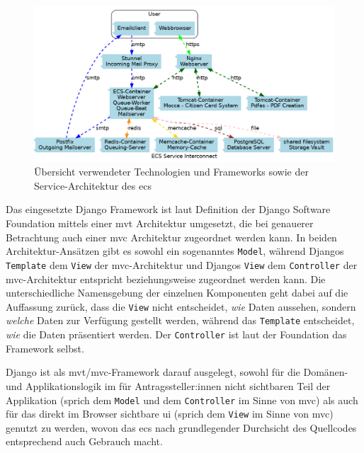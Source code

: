 \documentclass[a4paper,12pt,twoside]{scrreprt}
\begin{document}
\begin{figure}[ht]
    \centering
    \includegraphics[width=\linewidth]{thesis/images/ECS_Service-Architecture.png}
    \caption[Übersicht verwendeter Technologien und Frameworks sowie der Service-Architektur des \acl{ecs}]{Übersicht verwendeter Technologien und Frameworks sowie der Service-Architektur des \acl{ecs} \cite{medizinische_universitat_wien_ecs_2021}}
    \label{fig:ecs-service-architektur}
\end{figure}

Das eingesetzte Django Framework ist laut Definition der Django Software Foundation mittels einer \ac{mvt} Architektur umgesetzt, die bei genauerer Betrachtung auch einer \ac{mvc} Architektur zugeordnet werden kann. In beiden Architektur-Ansätzen gibt es sowohl ein sogenanntes \texttt{Model}, während Djangos \texttt{Template} dem \texttt{View} der \ac{mvc}-Architektur und Djangos \texttt{View} dem \texttt{Controller} der \ac{mvc}-Architektur entspricht beziehungsweise zugeordnet werden kann. Die unterschiedliche Namensgebung der einzelnen Komponenten geht dabei auf die Auffassung zurück, dass die \texttt{View} nicht entscheidet, \textit{wie} Daten aussehen, sondern \textit{welche} Daten zur Verfügung gestellt werden, während das \texttt{Template} entscheidet, \textit{wie} die Daten präsentiert werden. Der \texttt{Controller} ist laut der Foundation das Framework selbst. \cite{django_software_foundation_faq_2023}

\medskip

Django ist als \ac{mvt}/\ac{mvc}-Framework darauf ausgelegt, sowohl für die Domänen- und Applikationslogik im für Antragssteller:innen nicht sichtbaren Teil der Applikation (sprich dem \texttt{Model} und dem \texttt{Controller} im Sinne von \ac{mvc}) als auch für das direkt im Browser sichtbare \ac{ui} (sprich dem \texttt{View} im Sinne von \ac{mvc}) genutzt zu werden, wovon das \ac{ecs} nach grundlegender Durchsicht des Quellcodes entsprechend auch Gebrauch macht. \cite{ethics_commission_system_organization_ecs_2021}
\end{document}
